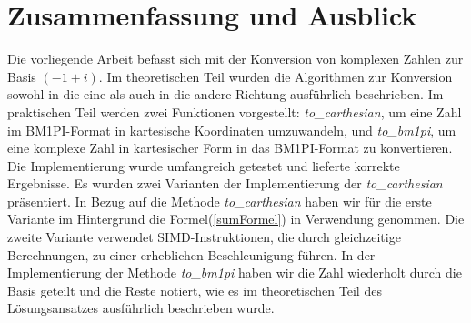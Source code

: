 \documentclass[course=erap]{aspdoc}
\begin{document}
    \section{Zusammenfassung und Ausblick}
    Die vorliegende Arbeit befasst sich mit der Konversion von komplexen Zahlen zur Basis $(-1 + i)$.
    Im theoretischen Teil wurden die Algorithmen zur Konversion sowohl in die eine als auch in die andere Richtung ausführlich beschrieben. \newline
    Im praktischen Teil werden zwei Funktionen vorgestellt: \textit{to\_carthesian}, um eine Zahl im BM1PI-Format in kartesische Koordinaten umzuwandeln, und \textit{to\_bm1pi}, um eine komplexe Zahl in kartesischer Form in das BM1PI-Format zu konvertieren.
    Die Implementierung wurde umfangreich getestet und lieferte korrekte Ergebnisse.
    Es wurden zwei Varianten der Implementierung der \textit{to\_carthesian} präsentiert.
    In Bezug auf die Methode \textit{to\_carthesian} haben wir für die erste Variante im Hintergrund die Formel(\ref{sumFormel}) in Verwendung genommen.
    Die zweite Variante verwendet SIMD-Instruktionen, die durch gleichzeitige Berechnungen, zu einer erheblichen Beschleunigung führen. \newline
    In der Implementierung der Methode \textit{to\_bm1pi} haben wir die Zahl wiederholt durch die Basis geteilt und die Reste notiert, wie es im theoretischen Teil des Lösungsansatzes ausführlich beschrieben wurde.


    
    
\end{document}
